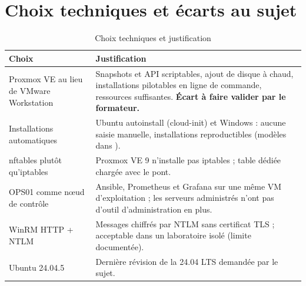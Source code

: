 \section{Choix techniques et écarts au sujet}

\begin{table}[H]
\centering
\caption{Choix techniques et justification}\label{tab:choix}
\begin{tabularx}{\linewidth}{@{}P{3.8cm}L@{}}
\toprule
\textbf{Choix} & \textbf{Justification} \\
\midrule
Proxmox VE au lieu de VMware Workstation & Snapshots et API scriptables, ajout de disque à chaud, installations pilotables en ligne de commande, ressources suffisantes. \textbf{Écart à faire valider par le formateur.} \\
Installations automatiques & Ubuntu autoinstall (cloud-init) et Windows  : aucune saisie manuelle, installations reproductibles (modèles dans ). \\
nftables plutôt qu'iptables & Proxmox VE 9 n'installe pas iptables ; table dédiée  chargée avec le pont. \\
OPS01 comme nœud de contrôle & Ansible, Prometheus et Grafana sur une même VM d'exploitation ; les serveurs administrés n'ont pas d'outil d'administration en plus. \\
WinRM HTTP + NTLM & Messages chiffrés par NTLM sans certificat TLS ; acceptable dans un laboratoire isolé (limite documentée). \\
Ubuntu 24.04.5 & Dernière révision de la 24.04 LTS demandée par le sujet. \\
\bottomrule
\end{tabularx}
\end{table}
